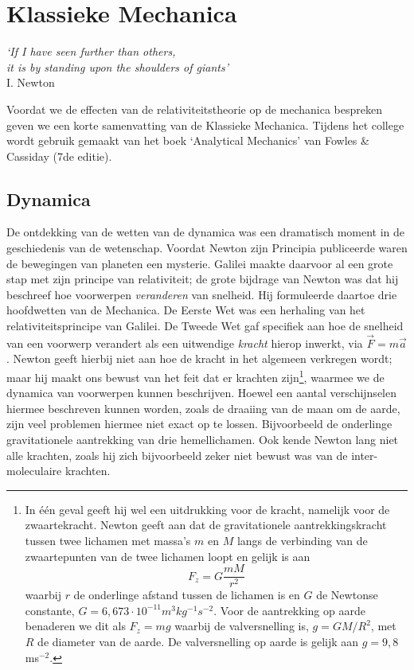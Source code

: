 \chapter{Klassieke Mechanica}
\vspace{-1cm}\begin{flushright}
{\it `If I have seen further than others, \\ it is by standing upon the shoulders of giants'}\\ I. Newton
\end{flushright}
Voordat we de effecten van de relativiteitstheorie op de mechanica
bespreken geven we een korte samenvatting van de Klassieke
Mechanica. Tijdens het college wordt gebruik gemaakt van het boek
`Analytical Mechanics' van \newline Fowles \& Cassiday (7de editie). 
\section{Dynamica}
De ontdekking van de wetten van de dynamica was een dramatisch moment
in de geschiedenis van de wetenschap. Voordat Newton zijn Principia
publiceerde waren de bewegingen van planeten een mysterie.
Galilei maakte daarvoor al een
grote stap met zijn principe van relativiteit; de grote bijdrage van Newton  was
dat hij beschreef hoe voorwerpen {\it veranderen} van snelheid.
Hij formuleerde daartoe drie hoofdwetten van de
Mechanica. De Eerste Wet was een herhaling van het relativiteitsprincipe van Galilei.
De Tweede Wet gaf specifiek aan hoe de snelheid van een voorwerp
verandert als een uitwendige {\it kracht} hierop inwerkt, via
$\vec{F}=m\vec{a}$. Newton geeft hierbij niet aan hoe de kracht in het
algemeen verkregen wordt; maar hij maakt ons bewust van het feit dat
er krachten zijn\footnote{In \'e\'en geval geeft hij wel een
uitdrukking voor de kracht, namelijk voor de zwaartekracht. Newton
geeft aan dat de gravitationele aantrekkingskracht tussen twee
lichamen met massa's $m$ en $M$ langs de verbinding van de
zwaartepunten van de twee lichamen loopt en gelijk is aan
\[ F_z = G \frac{mM}{r^2} \]
waarbij $r$ de onderlinge afstand tussen de lichamen is en $G$ de
Newtonse constante, $G=6,673 \cdot 10^{-11} m^3 kg^{-1} s^{-2}$. Voor
de aantrekking op aarde benaderen we dit als $F_z = m g $ waarbij de
valversnelling is, $g=G M/R^2$, met $R$ de diameter van de aarde. De
valversnelling op aarde is gelijk aan $g=9,8$ ms$^{-2}$. },
waarmee we de dynamica van voorwerpen kunnen beschrijven. Hoewel een
aantal verschijnselen hiermee beschreven kunnen worden, zoals de
draaiing van de maan om de aarde, zijn veel problemen hiermee niet
exact op te lossen. Bijvoorbeeld de onderlinge gravitationele aantrekking van drie
hemellichamen. Ook kende Newton lang niet alle krachten, zoals hij zich bijvoorbeeld 
zeker niet bewust was van de inter-moleculaire krachten.

